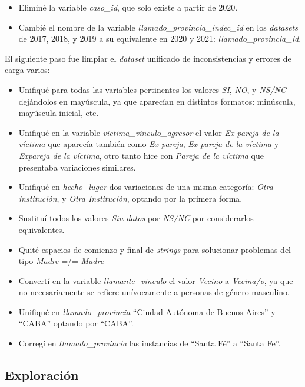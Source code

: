 \documentclass[10 pt]{article}
\begin{document}
\begin{itemize}
    \item Eliminé la variable \textit{caso\_id}, que solo existe a partir de 2020.
    \item Cambié el nombre de la variable \textit{llamado\_provincia\_indec\_id} en los \textit{datasets} de 2017, 2018, y 2019 a su equivalente en 2020 y 2021: \textit{llamado\_provincia\_id}.
\end{itemize}

El siguiente paso fue limpiar el \textit{dataset} unificado de inconsistencias y errores de carga varios: 
\begin{itemize}
    \item Unifiqué para todas las variables pertinentes los valores \textit{SI}, \textit{NO}, y \textit{NS/NC} dejándolos en mayúscula, ya que aparecían en distintos formatos: minúscula, mayúscula inicial, etc.
    \item Unifiqué en la variable \textit{victima\_vinculo\_agresor} el valor \textit{Ex pareja de la víctima} que aparecía también como \textit{Ex pareja}, \textit{Ex-pareja de la víctima} y \textit{Expareja de la víctima}, otro tanto hice con \textit{Pareja de la víctima} que presentaba variaciones similares.
    \item Unifiqué en \textit{hecho\_lugar} dos variaciones de una misma categoría: \textit{Otra institución}, y \textit{Otra Institución}, optando por la primera forma.
    \item Sustituí todos los valores \textit{Sin datos} por \textit{NS/NC} por considerarlos equivalentes.
    \item Quité espacios de comienzo y final de \textit{strings} para solucionar problemas del tipo \textit{Madre} =/= \textit{  Madre} 
    \item Convertí en la variable \textit{llamante\_vinculo} el valor \textit{Vecino} a \textit{Vecina/o}, ya que  no necesariamente se refiere unívocamente a personas de género masculino.
    \item Unifiqué en \textit{llamado\_provincia} “Ciudad Autónoma de Buenos Aires” y “CABA” optando por “CABA”. 
    \item Corregí en \textit{llamado\_provincia }las instancias de “Santa Fé” a “Santa Fe”.

\end{itemize}

\subsection*{Exploración}\label{exploración}
\end{document}
